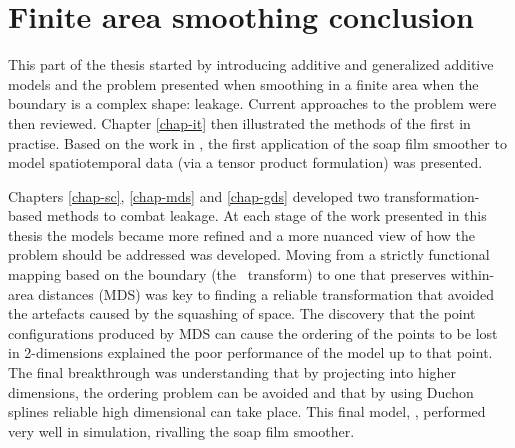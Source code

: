 \section{Finite area smoothing conclusion}
\label{gds-conclusion}

This part of the thesis started by introducing additive and generalized additive models and the problem presented when smoothing in a finite area when the boundary is a complex shape: leakage. Current approaches to the problem were then reviewed. Chapter \ref{chap-it} then illustrated the methods of the first in practise. Based on the work in , the first application of the soap film smoother to model spatiotemporal data (via a tensor product formulation) was presented.

Chapters \ref{chap-sc}, \ref{chap-mds} and \ref{chap-gds} developed two transformation-based methods to combat leakage. At each stage of the work presented in this thesis the models became more refined and a more nuanced view of how the problem should be addressed was developed. Moving from a strictly functional mapping based on the boundary (the \sch\ transform) to one that preserves within-area distances (MDS) was key to finding a reliable transformation that avoided the artefacts caused by the squashing of space. The discovery that the point configurations produced by MDS can cause the ordering of the points to be lost in 2-dimensions explained the poor performance of the model up to that point. The final breakthrough was understanding that by projecting into higher dimensions, the ordering problem can be avoided and that by using Duchon splines reliable high dimensional can take place. This final model, \mdsds, performed very well in simulation, rivalling the soap film smoother.

